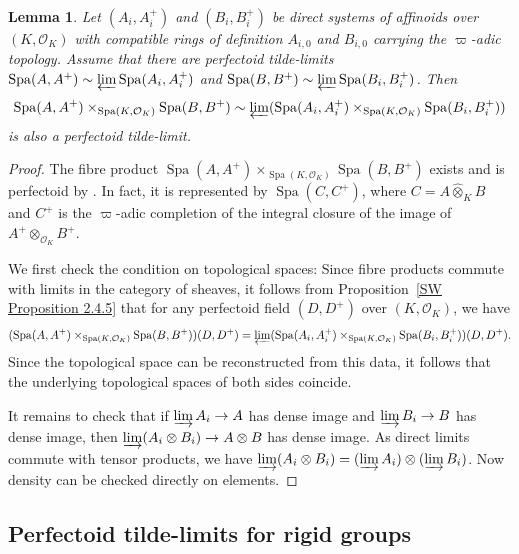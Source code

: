 \documentclass[10pt,oneside]{amsart}
\newtheorem{lemma}[theorem]{Lemma}
\theoremstyle{definition}
\renewcommand{\O}{\mathcal{O}}
\begin{document}
	\begin{lemma}\label{affinoid tilde-limits commute with fibre products}
		Let $(A_i, A_i^+)$ and $(B_i, B_i^+)$ be direct systems of affinoids over $(K, \mathcal O_K)$ with compatible rings of definition $A_{i,0}$ and $B_{i,0}$ carrying the $\varpi$-adic topology. Assume that there are perfectoid tilde-limits $\operatorname{Spa}(A, A^+)\sim \varprojlim \operatorname{Spa}(A_i, A_i^+)$ and $\operatorname{Spa}(B, B^+)\sim \varprojlim \operatorname{Spa}(B_i, B_i^+)$. Then \[\operatorname{Spa}(A, A^+)\times_{\operatorname{Spa}(K, \mathcal O_K)}\operatorname{Spa}(B, B^+)\sim\varprojlim (\operatorname{Spa}(A_i, A_i^+)\times_{\operatorname{Spa}(K, \mathcal O_K)} \operatorname{Spa}(B_i, B_i^+))\]
		is also a perfectoid tilde-limit.
	\end{lemma}
	\begin{proof}
		The fibre product $\operatorname{Spa}(A, A^+)\times_{\operatorname{Spa}(K, \mathcal O_K)}\operatorname{Spa}(B, B^+)$ exists and is perfectoid by \cite[Prop 6.18]{perfectoid}. In fact, it is represented by $\operatorname{Spa}(C,C^+)$, where $C=A\widehat{\otimes}_KB$ and $C^+$ is the $\varpi$-adic completion of the integral closure of the image of $A^+\otimes_{\mathcal O_K}B^+$.
		
		We first check the condition on topological spaces:
		 Since fibre products commute with limits in the category of sheaves, it follows from Proposition~\ref{SW Proposition 2.4.5} that for any perfectoid field $(D,D^+)$ over $(K,\O_K)$, we have 
\[
 (\operatorname{Spa}(A, A^+)\times_{\operatorname{Spa}(K, \mathcal O_K)}\operatorname{Spa}(B, B^+))(D,D^+)=\varprojlim (\operatorname{Spa}(A_i, A_i^+)\times_{\operatorname{Spa}(K, \mathcal O_K)} \operatorname{Spa}(B_i, B_i^+))(D,D^+).
\]
 Since the topological space can be reconstructed from this data, it follows that the underlying topological spaces of both sides coincide.
		
		It remains to check that if $\varinjlim A_i \rightarrow A$ has dense image and $\varinjlim B_i \rightarrow B$ has dense image, then $\varinjlim (A_i\otimes B_i) \rightarrow A\otimes B$ has dense image. As direct limits commute with tensor products, we have $\varinjlim (A_i\otimes B_i) = (\varinjlim A_i)\otimes (\varinjlim B_i)$. Now density can be checked directly on elements. 
	\end{proof}


\subsection{Perfectoid tilde-limits for rigid groups}
\end{document}
